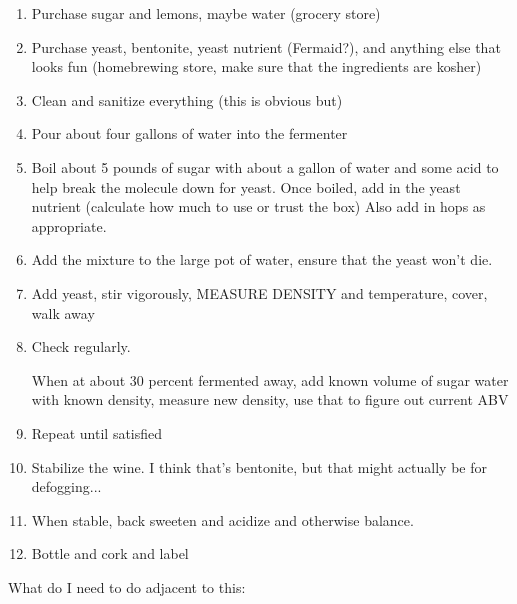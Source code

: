 \documentclass[12pt]{article}
\renewcommand{\,}{\textsuperscript{,}}
\begin{document}
\begin{enumerate}

\item Purchase sugar and lemons, maybe water (grocery store)

\item Purchase yeast, bentonite, yeast nutrient (Fermaid?), and anything else that looks fun (homebrewing store, make sure that the ingredients are kosher)

\item Clean and sanitize everything (this is obvious but)

\item Pour about four gallons of water into the fermenter

\item Boil about 5 pounds of sugar with about a gallon of water and some acid to help break the molecule down for yeast.  
Once boiled, add in the yeast nutrient (calculate how much to use or trust the box)  
Also add in hops as appropriate.

\item Add the mixture to the large pot of water, ensure that the yeast won't die.

\item Add yeast, stir vigorously, MEASURE DENSITY and temperature, cover, walk away

\item Check regularly.

When at about 30 percent fermented away, add known volume of sugar water with known density, measure new density, use that to figure out current ABV

\item Repeat until satisfied

\item Stabilize the wine. I think that's bentonite, but that might actually be for defogging...

\item When stable, back sweeten and acidize and otherwise balance.

\item Bottle and cork and label

\end{enumerate}

What do I need to do adjacent to this:
\end{document}
